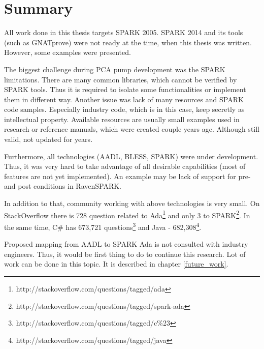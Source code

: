 
\cleardoublepage

\chapter{Summary}
\label{summary}

All work done in this thesis targets SPARK 2005. SPARK 2014 and its tools (such as GNATprove) were not ready at the time, when this thesis was written. However, some examples were presented.

The biggest challenge during PCA pump development was the SPARK limitations. There are many common libraries, which cannot be verified by SPARK tools. Thus it is required to isolate some functionalities or implement them in different way. Another issue was lack of many resources and SPARK code samples. Especially industry code, which is in this case, keep secretly as intellectual property. Available resources are usually small examples used in research or reference manuals, which were created couple years age. Although still valid, not updated for years.

Furthermore, all technologies (AADL, BLESS, SPARK) were under development. Thus, it was very hard to take advantage of all desirable capabilities (most of features are not yet implemented). An example may be lack of support for pre- and post conditions in RavenSPARK.

In addition to that, community working with above technologies is very small. On StackOverflow there is 728 question related to Ada\footnote{http://stackoverflow.com/questions/tagged/ada} and only 3 to SPARK\footnote{http://stackoverflow.com/questions/tagged/spark-ada}. In the same time, C\# has 673,721 questions\footnote{http://stackoverflow.com/questions/tagged/c\%23} and Java - 682,308\footnote{http://stackoverflow.com/questions/tagged/java}.

Proposed mapping from AADL to SPARK Ada is not consulted with industry engineers. Thus, it would be first thing to do to continue this research. Lot of work can be done in this topic. It is described in chapter \ref{future_work}.
